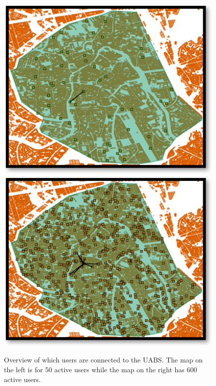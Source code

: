 \begin{figure}[!htb]
  \includegraphics[width=\linewidth]{../images/connectionsMap50Users.png}
\endminipage\hfill
{}%
  \includegraphics[width=\linewidth]{../images/connectionsMap600Users.png}
\endminipage
  \caption{Overview of which users are connected to the \gls{UABS}. The map on the left is for 50 active users while the map on the right has 600 active users.}
  \label{fig:connectionMap}
\end{figure}

